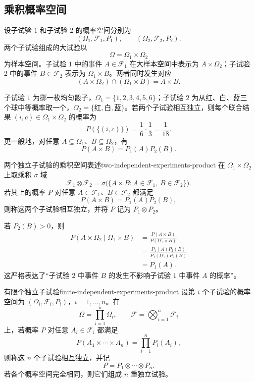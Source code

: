 \subsection*{乘积概率空间}

设子试验 $1$ 和子试验 $2$ 的概率空间分别为
\[
(\Omega_1,\mathscr F_1,P_1),
\qquad
(\Omega_2,\mathscr F_2,P_2).
\]
两个子试验组成的大试验以
\[
\Omega=\Omega_1\times\Omega_2
\]
为样本空间。子试验 $1$ 中的事件 $A\in\mathscr F_1$ 在大样本空间中表示为 $A\times\Omega_2$；子试验 $2$ 中的事件 $B\in\mathscr F_2$ 表示为 $\Omega_1\times B$。两者同时发生对应
\[
(A\times\Omega_2)\cap(\Omega_1\times B)=A\times B.
\]

\begin{example}[掷骰子与独立取球]
子试验 $1$ 为掷一枚均匀骰子，$\Omega_1=\{1,2,3,4,5,6\}$；子试验 $2$ 为从红、白、蓝三个球中等概率取一个，$\Omega_2=\{\text{红},\text{白},\text{蓝}\}$。若两个子试验相互独立，则每个联合结果 $(i,c)\in\Omega_1\times\Omega_2$ 的概率为
\[
P(\{(i,c)\})=\frac16\cdot\frac13=\frac1{18}.
\]
更一般地，对任意 $A\subseteq\Omega_1$、$B\subseteq\Omega_2$，有
\[
P(A\times B)=P_1(A)P_2(B).
\]
\end{example}

\begin{mydefinition}{两个独立子试验的乘积空间表述}{two-independent-experiments-product}
在 $\Omega_1\times\Omega_2$ 上取乘积 $\sigma$ 域
\[
\mathscr F_1\otimes\mathscr F_2
=\sigma\bigl(\{A\times B:A\in\mathscr F_1,\ B\in\mathscr F_2\}\bigr).
\]
若其上的概率 $P$ 对任意 $A\in\mathscr F_1$、$B\in\mathscr F_2$ 都满足
\[
P(A\times B)=P_1(A)P_2(B),
\]
则称这两个子试验相互独立，并将 $P$ 记为 $P_1\otimes P_2$。
\end{mydefinition}

若 $P_2(B)>0$，则
\[
\begin{aligned}
P(A\times\Omega_2\mid\Omega_1\times B)
&=\frac{P(A\times B)}{P(\Omega_1\times B)}\\
&=\frac{P_1(A)P_2(B)}{P_1(\Omega_1)P_2(B)}\\
&=P_1(A).
\end{aligned}
\]
这严格表达了“子试验 $2$ 中事件 $B$ 的发生不影响子试验 $1$ 中事件 $A$ 的概率”。

\begin{mydefinition}{有限个独立子试验}{finite-independent-experiments-product}
设第 $i$ 个子试验的概率空间为 $(\Omega_i,\mathscr F_i,P_i)$，$i=1,\ldots,n$。在
\[
\Omega=\prod_{i=1}^{n}\Omega_i,
\qquad
\mathscr F=\bigotimes_{i=1}^{n}\mathscr F_i
\]
上，若概率 $P$ 对任意 $A_i\in\mathscr F_i$ 都满足
\[
P(A_1\times\cdots\times A_n)
=\prod_{i=1}^{n}P_i(A_i),
\]
则称这 $n$ 个子试验相互独立，并记
\[
P=P_1\otimes\cdots\otimes P_n.
\]
若各个概率空间完全相同，则它们组成 $n$ 重独立试验。
\end{mydefinition}

